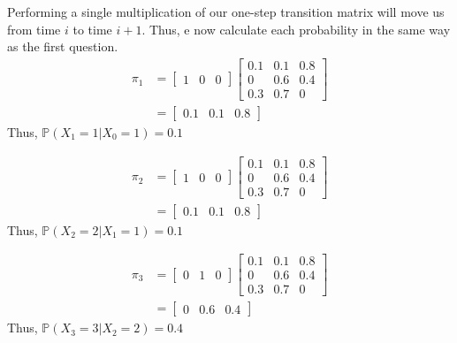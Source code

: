 \documentclass{article}
\newcommand{\prob}{\mathbb{P}}
\begin{document}
Performing a single multiplication of our one-step transition matrix will move
us from time $i$ to time $i+1$. Thus, e now calculate each probability
in the same way as the first question.
\begin{align*}
    \pi_1
    &=
    \begin{bmatrix}
        1 & 0 & 0
    \end{bmatrix}
    \begin{bmatrix}
        0.1 & 0.1 & 0.8 \\
          0 & 0.6 & 0.4 \\
        0.3 & 0.7 &   0
    \end{bmatrix} \\
    &=
    \begin{bmatrix}
        0.1 & 0.1 & 0.8
    \end{bmatrix}
\end{align*}
Thus, $\prob(X_1 = 1 | X_0 = 1) = 0.1$

\begin{align*}
    \pi_2
    &=
    \begin{bmatrix}
        1 & 0 & 0
    \end{bmatrix}
    \begin{bmatrix}
        0.1 & 0.1 & 0.8 \\
          0 & 0.6 & 0.4 \\
        0.3 & 0.7 &   0
    \end{bmatrix} \\
    &=
    \begin{bmatrix}
        0.1 & 0.1 & 0.8
    \end{bmatrix}
\end{align*}
Thus, $\prob(X_2 = 2 | X_1 = 1) = 0.1$

\begin{align*}
    \pi_3
    &=
    \begin{bmatrix}
        0 & 1 & 0
    \end{bmatrix}
    \begin{bmatrix}
        0.1 & 0.1 & 0.8 \\
          0 & 0.6 & 0.4 \\
        0.3 & 0.7 &   0
    \end{bmatrix} \\
    &=
    \begin{bmatrix}
        0 & 0.6 & 0.4
    \end{bmatrix}
\end{align*}
Thus, $\prob(X_3 = 3 | X_2 = 2) = 0.4$
\end{document}
